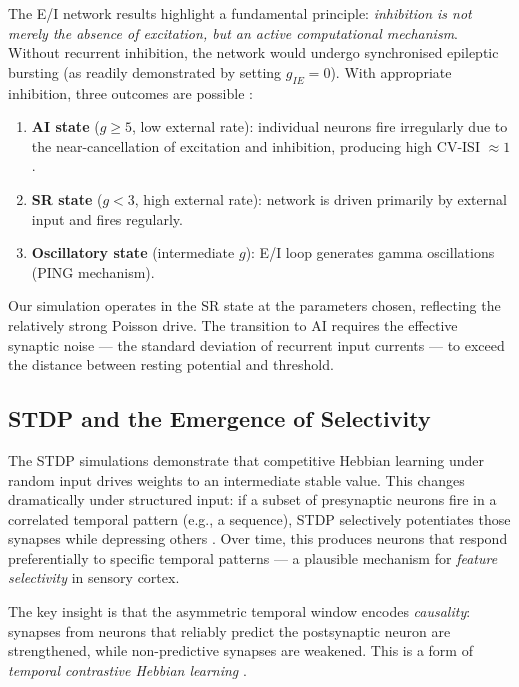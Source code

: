 \documentclass[11pt, a4paper, twocolumn]{article}
\begin{document}
The E/I network results highlight a fundamental principle: \emph{inhibition
is not merely the absence of excitation, but an active computational mechanism}.
Without recurrent inhibition, the network would undergo synchronised epileptic
bursting (as readily demonstrated by setting $g_{IE} = 0$). With appropriate
inhibition, three outcomes are possible \citep{Brunel2000}:

\begin{enumerate}[leftmargin=1.2em, itemsep=2pt]
  \item \textbf{AI state} ($g \geq 5$, low external rate): individual
    neurons fire irregularly due to the near-cancellation of excitation and
    inhibition, producing high CV-ISI $\approx 1$.
  \item \textbf{SR state} ($g < 3$, high external rate): network is
    driven primarily by external input and fires regularly.
  \item \textbf{Oscillatory state} (intermediate $g$): E/I loop generates
    gamma oscillations (PING mechanism).
\end{enumerate}

Our simulation operates in the SR state at the parameters chosen, reflecting
the relatively strong Poisson drive. The transition to AI requires the effective
synaptic noise --- the standard deviation of recurrent input currents --- to
exceed the distance between resting potential and threshold.

\subsection{STDP and the Emergence of Selectivity}

The STDP simulations demonstrate that competitive Hebbian learning under
random input drives weights to an intermediate stable value. This changes
dramatically under structured input: if a subset of presynaptic neurons
fire in a correlated temporal pattern (e.g., a sequence), STDP selectively
potentiates those synapses while depressing others \citep{Song2000}. Over
time, this produces neurons that respond preferentially to specific temporal
patterns --- a plausible mechanism for \emph{feature selectivity} in sensory
cortex.

The key insight is that the asymmetric temporal window encodes
\emph{causality}: synapses from neurons that reliably predict the postsynaptic
neuron are strengthened, while non-predictive synapses are weakened. This is
a form of \emph{temporal contrastive Hebbian learning} \citep{Abbott2000}.
\end{document}
